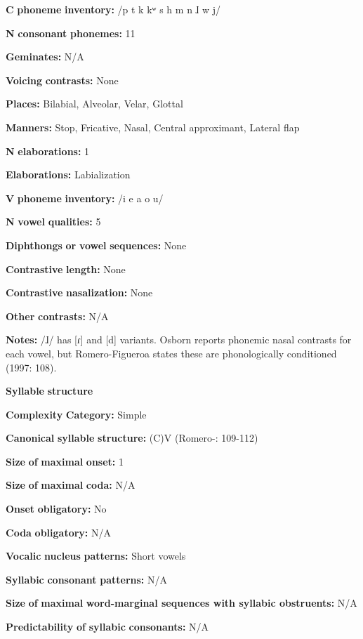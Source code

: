 \begin{styleBody}
\textbf{C} \textbf{phoneme} \textbf{inventory:} /p t k kʷ s h m n ɺ w j/

\textbf{N} \textbf{consonant} \textbf{phonemes:} 11

\textbf{Geminates:} N/A

\textbf{Voicing} \textbf{contrasts:} None

\textbf{Places:} Bilabial, Alveolar, Velar, Glottal

\textbf{Manners:} Stop, Fricative, Nasal, Central approximant, Lateral flap

\textbf{N} \textbf{elaborations:} 1

\textbf{Elaborations:} Labialization

\textbf{V} \textbf{phoneme} \textbf{inventory:} /i e a o u/

\textbf{N} \textbf{vowel} \textbf{qualities:} 5

\textbf{Diphthongs} \textbf{or} \textbf{vowel} \textbf{sequences:} None

\textbf{Contrastive} \textbf{length:} None

\textbf{Contrastive} \textbf{nasalization:} None

\textbf{Other} \textbf{contrasts:} N/A

\textbf{Notes:} /ɺ/ has [ɾ] and [d] variants. Osborn reports phonemic nasal contrasts for each vowel, but Romero-Figueroa states these are phonologically conditioned (1997: 108).

\textbf{Syllable} \textbf{structure}

\textbf{Complexity} \textbf{Category:} Simple

\textbf{Canonical} \textbf{syllable} \textbf{structure:} (C)V (Romero-\citealt{Figeroa1997}: 109-112)

\textbf{Size} \textbf{of} \textbf{maximal} \textbf{onset:} 1

\textbf{Size} \textbf{of} \textbf{maximal} \textbf{coda:} N/A

\textbf{Onset} \textbf{obligatory:} No

\textbf{Coda} \textbf{obligatory:} N/A

\textbf{Vocalic} \textbf{nucleus} \textbf{patterns:} Short vowels

\textbf{Syllabic} \textbf{consonant} \textbf{patterns:} N/A

\textbf{Size} \textbf{of} \textbf{maximal} \textbf{word{}-marginal sequences with syllabic obstruents:} N/A

\textbf{Predictability} \textbf{of} \textbf{syllabic} \textbf{consonants:} N/A


\end{styleBody}
